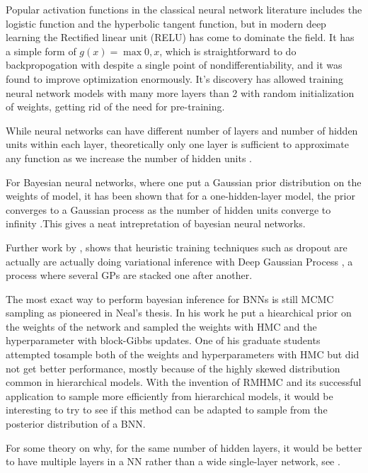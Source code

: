 \documentclass{book}
\begin{document}
\begin{enumerate}
Popular activation functions in the classical neural network literature includes
the logistic function and the hyperbolic tangent function, but in modern deep
learning the Rectified linear unit (RELU) has come to dominate the field. It has
a simple form of $g(x)=\max{0,x}$, which is straightforward to do
backpropogation with despite a single point of nondifferentiability, and it was
found to improve optimization enormously. It's discovery has allowed training
neural network models with many more layers than 2 with random initialization of
weights, getting rid of the need for pre-training. 

While neural networks can have different number of layers and number of hidden
units within each layer, theoretically only one layer is sufficient to
approximate any function as we increase the number of hidden units \cite{hornik1991approximation}. 

For Bayesian neural networks, where one put a Gaussian prior distribution on the weights of model, it has been shown that for a one-hidden-layer model, the prior converges to a Gaussian process as the number of hidden units converge to infinity \cite{neal2012bayesian}.This gives a neat intrepretation of bayesian neural networks. 

Further work by \cite{gal2015dropout}, shows that heuristic training techniques such as dropout are actually are actually doing variational inference with Deep Gaussian Process \cite{damianou2013deep}, a process where several GPs are stacked one after another. 

The most exact way to perform bayesian inference for BNNs is still MCMC sampling as pioneered in Neal's thesis. In his work he put a hiearchical prior on the weights of the network and sampled the weights with HMC and the hyperparameter with block-Gibbs updates. One of his graduate students attempted tosample both of the weights and hyperparameters with HMC but did not get better performance, mostly because of the highly skewed distribution common in hierarchical models. With the invention of RMHMC and its successful application to sample more efficiently from hierarchical models, it would be interesting to try to see if this method can be adapted to sample from the posterior distribution of a BNN. 

For some theory on why, for the same number of hidden layers, it would be better to have multiple layers in a NN rather than a wide single-layer network, see \cite{montufar2014number}. 




\end{enumerate}
\end{document}

